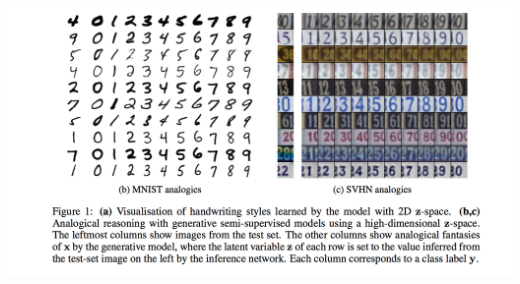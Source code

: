 \documentclass{beamer}
\begin{document}
\begin{frame}
  \begin{center}

\includegraphics[scale=0.4]{p3.png}

  \end{center}
\end{frame}
\end{document}
